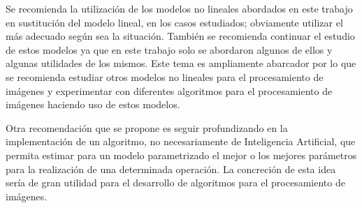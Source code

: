 \begin{recomendations}
    Se recomienda la utilizaci\'on de los modelos no lineales abordados en este trabajo en sustituci\'on del modelo lineal, en los casos estudiados; obviamente utilizar el m\'as adecuado seg\'un sea la situaci\'on. Tambi\'en se recomienda continuar el estudio de estos modelos ya que en este trabajo solo se abordaron algunos de ellos y algunas utilidades de los mismos. Este tema es ampliamente abarcador por lo que se recomienda estudiar otros modelos no lineales para el procesamiento de im\'agenes y experimentar con diferentes algoritmos para el procesamiento de im\'agenes haciendo uso de estos modelos.
    
    Otra recomendaci\'on que se propone es seguir profundizando en la implementaci\'on de un algoritmo, no necesariamente de Inteligencia Artificial, que permita estimar para un modelo parametrizado el mejor o los mejores par\'ametros para la realizaci\'on de una determinada operaci\'on. La concreci\'on de esta idea ser\'ia de gran utilidad para el desarrollo de algoritmos para el procesamiento de im\'agenes.
\end{recomendations}
